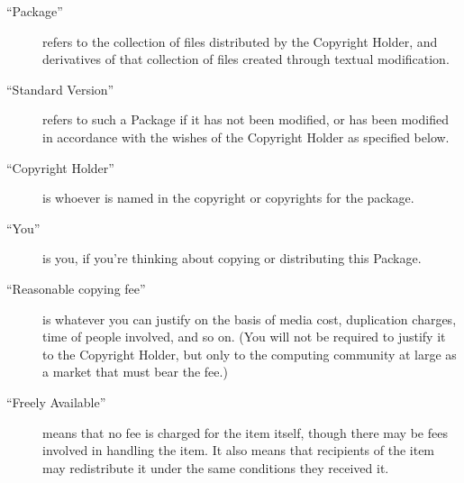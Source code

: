 \documentclass[a4paper]{article}
\begin{document}
\begin{description}
\item[``Package''] refers to the collection of files distributed by the
        Copyright Holder, and derivatives of that collection of files
        created through textual modification.

\item[``Standard Version''] refers to such a Package if it has not been
        modified, or has been modified in accordance with the wishes
        of the Copyright Holder as specified below.

\item[``Copyright Holder''] is whoever is named in the copyright or
        copyrights for the package.

\item[``You''] is you, if you're thinking about copying or distributing
        this Package.

\item[``Reasonable copying fee''] is whatever you can justify on the
        basis of media cost, duplication charges, time of people involved,
        and so on.  (You will not be required to justify it to the
        Copyright Holder, but only to the computing community at large
        as a market that must bear the fee.)

\item[``Freely Available''] means that no fee is charged for the item
        itself, though there may be fees involved in handling the item.
        It also means that recipients of the item may redistribute it
        under the same conditions they received it.
\end{description}
\end{document}
